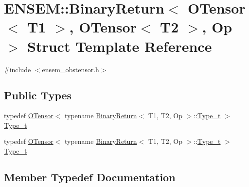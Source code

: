 \hypertarget{structENSEM_1_1BinaryReturn_3_01OTensor_3_01T1_01_4_00_01OTensor_3_01T2_01_4_00_01Op_01_4}{}\section{E\+N\+S\+EM\+:\+:Binary\+Return$<$ O\+Tensor$<$ T1 $>$, O\+Tensor$<$ T2 $>$, Op $>$ Struct Template Reference}
\label{structENSEM_1_1BinaryReturn_3_01OTensor_3_01T1_01_4_00_01OTensor_3_01T2_01_4_00_01Op_01_4}


{\ttfamily \#include $<$ensem\+\_\+obstensor.\+h$>$}

\subsection*{Public Types}
\begin{DoxyCompactItemize}
\item 
typedef \mbox{\hyperlink{classENSEM_1_1OTensor}{O\+Tensor}}$<$ typename \mbox{\hyperlink{structENSEM_1_1BinaryReturn}{Binary\+Return}}$<$ T1, T2, Op $>$\+::\mbox{\hyperlink{structENSEM_1_1BinaryReturn_3_01OTensor_3_01T1_01_4_00_01OTensor_3_01T2_01_4_00_01Op_01_4_a668298286c843e5bab2f6b4143669da5}{Type\+\_\+t}} $>$ \mbox{\hyperlink{structENSEM_1_1BinaryReturn_3_01OTensor_3_01T1_01_4_00_01OTensor_3_01T2_01_4_00_01Op_01_4_a668298286c843e5bab2f6b4143669da5}{Type\+\_\+t}}
\item 
typedef \mbox{\hyperlink{classENSEM_1_1OTensor}{O\+Tensor}}$<$ typename \mbox{\hyperlink{structENSEM_1_1BinaryReturn}{Binary\+Return}}$<$ T1, T2, Op $>$\+::\mbox{\hyperlink{structENSEM_1_1BinaryReturn_3_01OTensor_3_01T1_01_4_00_01OTensor_3_01T2_01_4_00_01Op_01_4_a668298286c843e5bab2f6b4143669da5}{Type\+\_\+t}} $>$ \mbox{\hyperlink{structENSEM_1_1BinaryReturn_3_01OTensor_3_01T1_01_4_00_01OTensor_3_01T2_01_4_00_01Op_01_4_a668298286c843e5bab2f6b4143669da5}{Type\+\_\+t}}
\end{DoxyCompactItemize}


\subsection{Member Typedef Documentation}
\mbox{\label{structENSEM_1_1BinaryReturn_3_01OTensor_3_01T1_01_4_00_01OTensor_3_01T2_01_4_00_01Op_01_4_a668298286c843e5bab2f6b4143669da5}} 
